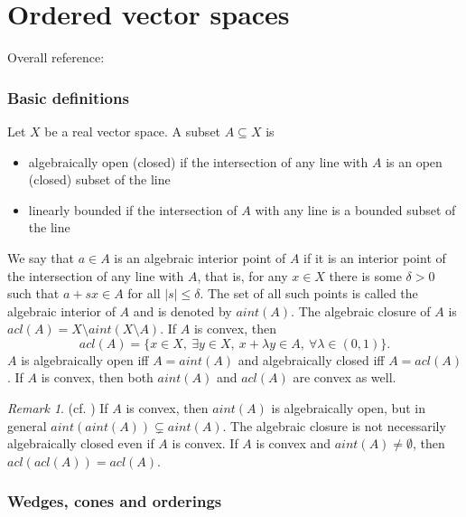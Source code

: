 \documentclass[12pt]{article}
\theoremstyle{remark}
\newtheorem{rem}{Remark}
\newcommand{\<}{\langle}
\begin{document}
\section{Ordered vector spaces }

Overall reference:  \cite{jameson}

\subsubsection*{Basic definitions}

Let $X$ be a real vector space. A subset $A\subseteq X$ is 
\begin{itemize}
\item algebraically open (closed) if the intersection of any line with $A$ is an open (closed) subset of the line
\item linearly bounded if the intersection of $A$ with any line is  a bounded subset of the line
\end{itemize}
We say that $a\in A$ is an algebraic interior point of $A$ if it is an interior point of the intersection of any line with $A$, that is, 
for any $x\in X$ there is some $\delta>0$ such that $a+sx\in A$ for all $|s|\le \delta$. 
 The set of all such points is called the algebraic interior of $A$ and is denoted by $aint(A)$. The algebraic closure of $A$ is $acl(A)=X\setminus aint(X\setminus A)$.
If $A$ is convex, then
\[
acl(A)=\{x\in X,\ \exists y\in X,\ x+\lambda y\in A,\ \forall \lambda\in (0,1)\}.
\]
$A$ is algebraically open iff $A=aint(A)$ and algebraically closed iff $A=acl(A)$. If $A$ is convex, then both $aint(A)$ and $acl(A)$ are convex as well.

\begin{rem} (cf. \cite[\S 16]{kothe}) 
If $A$ is convex, then $aint(A)$ is algebraically open, but  in general $aint(aint(A))\subsetneq aint(A)$. The algebraic closure is not necessarily algebraically closed even if $A$ is convex. If $A$ is convex and $aint(A)\ne \emptyset$, then $acl(acl(A))=acl(A)$. \end{rem}


\subsubsection*{Wedges, cones and orderings}
\end{document}
